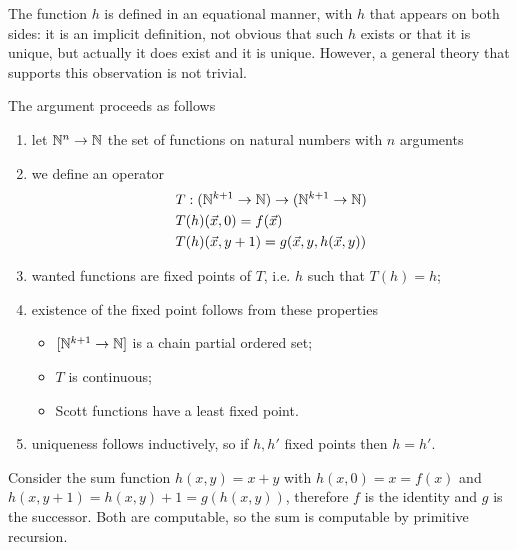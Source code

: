 \begin{remark}
  The function $h$ is defined in an equational manner, with $h$ that appears on both sides: 
  it is an implicit definition, not obvious that such $h$ exists or that it is unique, 
  but actually it does exist and it is unique. However, a general theory that supports this observation is not trivial.

  The argument proceeds as follows

\begin{enumerate}
\item let $\mathbb{N}^n\rightarrow\mathbb{N}$ the set of functions on natural numbers with $n$ arguments
\item we define an operator
  \begin{align*}
    &T: (\mathbb{N}^{k+1}\rightarrow\mathbb{N}) \rightarrow (\mathbb{N}^{k+1}\rightarrow\mathbb{N})\\
    &T(h)(\vec{x},0) = f(\vec{x})\\
    &T(h)(\vec{x},y+1) = g(\vec{x},y,h(\vec{x},y))
  \end{align*}
\item wanted functions are fixed points of $T$, i.e. $h$ such that $T(h) = h$;
\item existence of the fixed point follows from these properties
  \begin{itemize}
  \item $[\mathbb{N}^{k+1}\rightarrow\mathbb{N}]$ is a chain partial ordered set;
  \item $T$ is continuous;
  \item Scott functions have a least fixed point.
  \end{itemize}
\item uniqueness follows inductively, so if $h,h'$ fixed points then $h=h'$.
\end{enumerate}
\end{remark}

\begin{example}
  Consider the sum function $ h(x,y) = x+y $ with $ h(x,0) = x = f(x) $ and $ h(x,y+1) = h(x,y) + 1 = g(h(x,y)) $, therefore $f$ is the identity and $g$ is the successor.
   Both are computable, so the sum is computable by primitive recursion.
\end{example}



